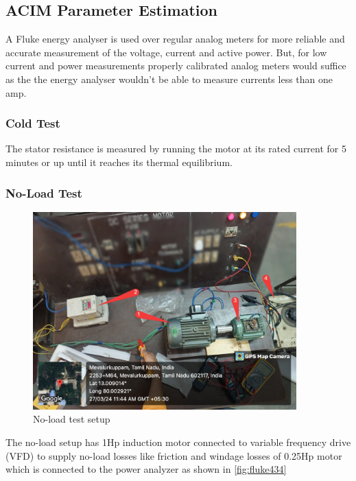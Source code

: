 \subsection{ACIM Parameter Estimation}

A Fluke energy analyser is used over regular analog meters for more reliable and accurate measurement of the voltage, current and active power. But, for low current and power measurements properly calibrated analog meters would suffice as the the energy analyser wouldn’t be able to measure currents less than one amp.

\subsubsection{Cold Test}

The stator resistance is measured by running the motor at its rated current for 5 minutes or up until it reaches its thermal equilibrium.


\subsubsection{No-Load Test}


\begin{figure}[H]
	\centering
	\includegraphics[width=4in]{sections/section5/images/ParamEstim/SetupNoload.jpg}
	\caption{No-load test setup}
	\label{fig:no_load_test_setup}
\end{figure}

The no-load setup has 1Hp induction motor connected to variable frequency drive (VFD) to supply no-load losses like friction and windage losses of 0.25Hp motor which is connected to the power analyzer as shown in \ref*{fig:fluke434}


